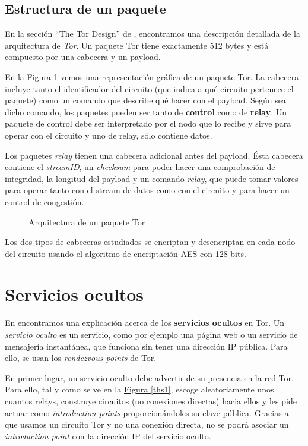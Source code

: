 \documentclass[10pt,a4paper,spanish]{article}
\begin{document}
\subsection{Estructura de un paquete}
En la sección ``The Tor Design'' de \cite{design}, encontramos una descripción detallada de la arquitectura de \textit{Tor}. Un paquete Tor tiene exactamente 512 bytes y está compuesto por una cabecera y un payload. 

En la \hyperref[paquete]{Figura \ref*{paquete}} vemos una representación gráfica de un paquete Tor. La cabecera incluye tanto el identificador del circuito (que indica a qué circuito pertenece el paquete) como un comando que describe qué hacer con el payload. Según sea dicho comando, los paquetes pueden ser tanto de \textbf{control} como de \textbf{relay}. Un paquete de control debe ser interpretado por el nodo que lo recibe y sirve para operar con el circuito y uno de relay, sólo contiene datos.

Los paquetes \textit{relay} tienen una cabecera adicional antes del payload. Ésta cabecera contiene el \textit{streamID}, un \textit{checksum} para poder hacer una comprobación de integridad, la longitud del payload y un comando \textit{relay}, que puede tomar valores para operar tanto con el stream de datos como con el circuito y para hacer un control de congestión.

\begin{figure}[!h]
    \centering
    
    \caption{Arquitectura de un paquete Tor}
    \label{paquete}
\end{figure}

Los dos tipos de cabeceras estudiados se encriptan y desencriptan en cada nodo del circuito usando el algoritmo de encriptación AES con 128-bits.

\section{Servicios ocultos}
En \cite{hiddenservices} encontramos una explicación acerca de los \textbf{servicios ocultos} en Tor. Un \textit{servicio oculto} es un servicio, como por ejemplo una página web o un servicio de mensajería instantánea, que funciona sin tener una dirección IP pública. Para ello, se usan los \textit{rendezvous points} de Tor.

En primer lugar, un servicio oculto debe advertir de su presencia en la red Tor. Para ello, tal y como se ve en la \hyperref[ths1]{Figura \ref*{ths1}}, escoge aleatoriamente unos cuantos relays, construye circuitos (no conexiones directas) hacia ellos y les pide actuar como \textit{introduction points} proporcionándoles su clave pública. Gracias a que usamos un circuito Tor y no una conexión directa, no se podrá asociar un \textit{introduction point} con la dirección IP del servicio oculto.
\end{document}
